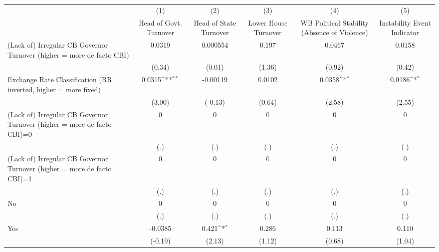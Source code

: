 {
\def\sym#1{\ifmmode^{#1}\else\(^{#1}\)\fi}
\begin{tabular*}{\linewidth}{@{\hskip\tabcolsep\extracolsep\fill}l*{5}{c}}
\hline\hline
                &\multicolumn{1}{c}{(1)}&\multicolumn{1}{c}{(2)}&\multicolumn{1}{c}{(3)}&\multicolumn{1}{c}{(4)}&\multicolumn{1}{c}{(5)}\\
                &\multicolumn{1}{c}{Head of Govt. Turnover}&\multicolumn{1}{c}{Head of State Turnover}&\multicolumn{1}{c}{Lower House Turnover}&\multicolumn{1}{c}{WB Political Stability (Absence of Violence)}&\multicolumn{1}{c}{Instability Event Indicator}\\
\hline
(Lack of) Irregular CB Governor Turnover (higher = more de facto CBI)&   0.0319         & 0.000554         &    0.197         &   0.0467         &   0.0158         \\
                &   (0.34)         &   (0.01)         &   (1.36)         &   (0.92)         &   (0.42)         \\
[1em]
Exchange Rate Classification (RR inverted, higher = more fixed)&   0.0315\sym{**} & -0.00119         &   0.0102         &   0.0358\sym{*}  &   0.0186\sym{*}  \\
                &   (3.00)         &  (-0.13)         &   (0.64)         &   (2.58)         &   (2.55)         \\
[1em]
(Lack of) Irregular CB Governor Turnover (higher = more de facto CBI)=0&        0         &        0         &        0         &        0         &        0         \\
                &      (.)         &      (.)         &      (.)         &      (.)         &      (.)         \\
[1em]
(Lack of) Irregular CB Governor Turnover (higher = more de facto CBI)=1&        0         &        0         &        0         &        0         &        0         \\
                &      (.)         &      (.)         &      (.)         &      (.)         &      (.)         \\
[1em]
No              &        0         &        0         &        0         &        0         &        0         \\
                &      (.)         &      (.)         &      (.)         &      (.)         &      (.)         \\
[1em]
Yes             &  -0.0385         &    0.421\sym{*}  &    0.286         &    0.113         &    0.110         \\
                &  (-0.19)         &   (2.13)         &   (1.12)         &   (0.68)         &   (1.04)         \\

\end{tabular*}}
